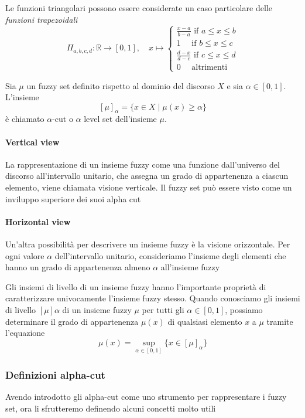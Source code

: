 Le funzioni triangolari possono essere considerate un caso particolare delle \textit{funzioni trapezoidali}
$$
\Pi_{a,b,c,d} : \mathbb{R} \to [0,1],\quad x \mapsto 
    \begin{cases}
        \frac{x-a}{b-a} \text{ if } a \leq x \leq b \\
        1 \quad \text{ if  }  b \leq x \leq c \\
        \frac{d-x}{d-c} \text{ if } c \leq x \leq d \\
        0 \quad \text{  altrimenti}
    \end{cases}
$$

 \begin{definizione}
Sia $\mu$ un fuzzy set definito rispetto al dominio del discorso $X$ e sia $\alpha \in [0,1]$. L'insieme
$$[\mu]_\alpha = \{x \in X \;|\; \mu(x) \geq \alpha \}$$
è chiamato $\alpha$-cut o $\alpha$ level set dell'insieme $\mu$.
 \end{definizione}

\paragraph{Vertical view}
La rappresentazione di un insieme fuzzy come una funzione dall'universo del discorso all'intervallo unitario, che assegna un grado di appartenenza a ciascun elemento, viene chiamata visione verticale. Il fuzzy set può essere visto come un inviluppo superiore dei suoi alpha cut

\paragraph{Horizontal view}
Un'altra possibilità per descrivere un insieme fuzzy è la visione orizzontale. Per ogni valore $\alpha$ dell'intervallo unitario, consideriamo l'insieme degli elementi che hanno un grado di appartenenza almeno $\alpha$ all'insieme fuzzy

Gli insiemi di livello di un insieme fuzzy hanno l'importante proprietà di caratterizzare univocamente l'insieme fuzzy stesso. Quando conosciamo gli insiemi di livello $[\mu]\alpha$ di un insieme fuzzy $\mu$ per tutti gli $\alpha \in [0, 1]$, possiamo determinare il grado di appartenenza $\mu(x)$ di qualsiasi elemento $x$ a $\mu$ tramite l'equazione
$$\mu(x) = \sup_{\alpha \in [0,1]} \{x \in [\mu]_{\alpha}\}$$

\subsubsection{Definizioni alpha-cut}
Avendo introdotto gli alpha-cut come uno strumento per rappresentare i fuzzy set, ora li sfrutteremo definendo alcuni concetti molto utili


